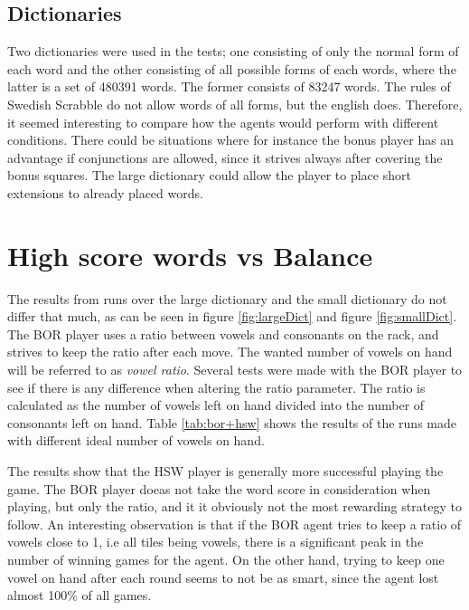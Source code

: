 \documentclass[a4paper, 12pt]{report}
\begin{document}
\subsection{Dictionaries}
Two dictionaries were used in the tests; one consisting of only the normal form of each word and the other consisting of all possible forms of each words, where the latter is a set of 480391 words. The former consists of 83247 words. The rules of Swedish Scrabble do not allow words of all forms, but the english does. Therefore, it seemed interesting to compare how the agents would perform with different conditions. There could be situations where for instance the bonus player has an advantage if conjunctions are allowed, since it strives always after covering the bonus squares. The large dictionary could allow the player to place short extensions to already placed words.

\section{High score words vs Balance}
\label{sec:highBalance}

The results from runs over the large dictionary and the small dictionary do not differ that much, as can be seen in figure \ref{fig:largeDict} and figure \ref{fig:smallDict}.
The BOR player uses a ratio between vowels and consonants on the rack, and strives to keep the ratio after each move. The wanted number of vowels on hand will be referred to as \emph{vowel ratio}. Several tests were made with the BOR player to see if there is any difference when altering the ratio parameter. The ratio is calculated as the number of vowels left on hand divided into the number of consonants left on hand. Table \ref{tab:bor+hsw} shows the results of the runs made with different ideal number of vowels on hand.

The results show that the HSW player is generally more successful playing the game. The BOR player doeas not take the word score in consideration when playing, but only the ratio, and it it obviously not the most rewarding strategy to follow. An interesting observation is that if the BOR agent tries to keep a ratio of vowels close to 1, i.e all tiles being vowels, there is a significant peak in the number of winning games for the agent. On the other hand, trying to keep one vowel on hand after each round seems to not be as smart, since the agent lost almost 100\% of all games.
\end{document}
